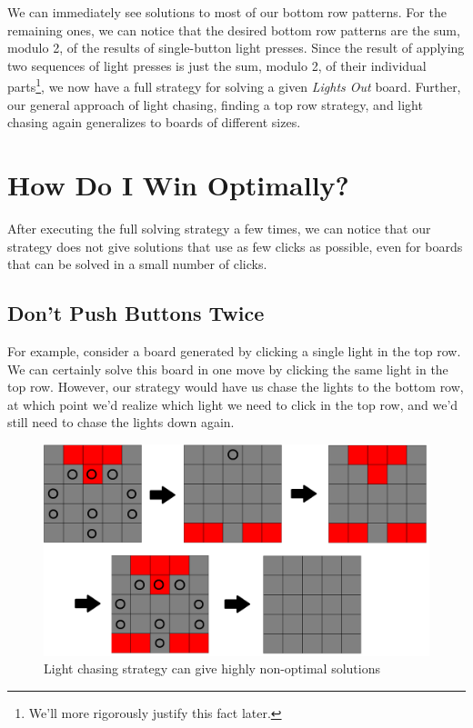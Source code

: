 \documentclass[a4paper]{article}
\begin{document}
	We can immediately see solutions to most of our bottom row patterns.
	For the remaining ones, we can notice that the desired bottom row patterns are the sum, modulo 2, of the results of single-button light presses.
	Since the result of applying two sequences of light presses is just the sum, modulo 2, of their individual parts\footnote{We'll more rigorously justify this fact later.}, we now have a full strategy for solving a given \textit{Lights Out} board.
	Further, our general approach of light chasing, finding a top row strategy, and light chasing again generalizes to boards of different sizes.
	
	\section{How Do I Win Optimally?}
	After executing the full solving strategy a few times, we can notice that our strategy does not give solutions that use as few clicks as possible, even for boards that can be solved in a small number of clicks.
	
	\subsection{Don't Push Buttons Twice}
	For example, consider a board generated by clicking a single light in the top row.
	We can certainly solve this board in one move by clicking the same light in the top row.
	However, our strategy would have us chase the lights to the bottom row, at which point we'd realize which light we need to click in the top row, and we'd still need to chase the lights down again.
	
	\begin{figure}[H]
		\centering
		\includegraphics[width=\textwidth]{board5.png}
		\caption{Light chasing strategy can give highly non-optimal solutions}
	\end{figure}
\end{document}

